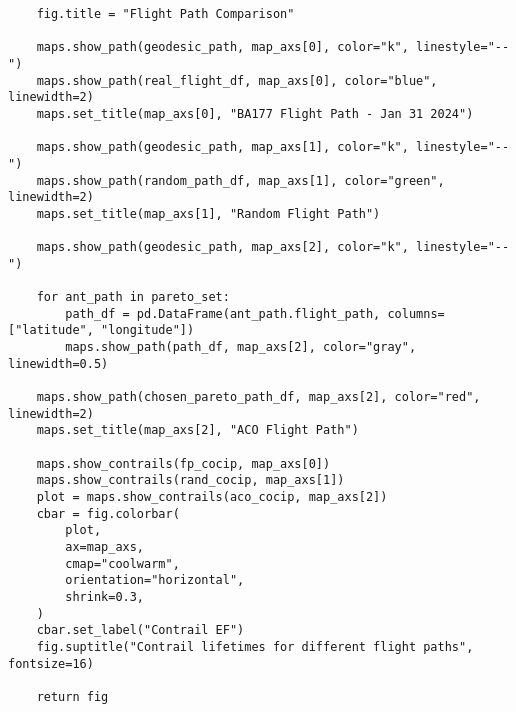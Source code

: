 \begin{verbatim}
    fig.title = "Flight Path Comparison"

    maps.show_path(geodesic_path, map_axs[0], color="k", linestyle="--")
    maps.show_path(real_flight_df, map_axs[0], color="blue", linewidth=2)
    maps.set_title(map_axs[0], "BA177 Flight Path - Jan 31 2024")

    maps.show_path(geodesic_path, map_axs[1], color="k", linestyle="--")
    maps.show_path(random_path_df, map_axs[1], color="green", linewidth=2)
    maps.set_title(map_axs[1], "Random Flight Path")

    maps.show_path(geodesic_path, map_axs[2], color="k", linestyle="--")

    for ant_path in pareto_set:
        path_df = pd.DataFrame(ant_path.flight_path, columns=["latitude", "longitude"])
        maps.show_path(path_df, map_axs[2], color="gray", linewidth=0.5)

    maps.show_path(chosen_pareto_path_df, map_axs[2], color="red", linewidth=2)
    maps.set_title(map_axs[2], "ACO Flight Path")

    maps.show_contrails(fp_cocip, map_axs[0])
    maps.show_contrails(rand_cocip, map_axs[1])
    plot = maps.show_contrails(aco_cocip, map_axs[2])
    cbar = fig.colorbar(
        plot,
        ax=map_axs,
        cmap="coolwarm",
        orientation="horizontal",
        shrink=0.3,
    )
    cbar.set_label("Contrail EF")
    fig.suptitle("Contrail lifetimes for different flight paths", fontsize=16)

    return fig

\end{verbatim}

